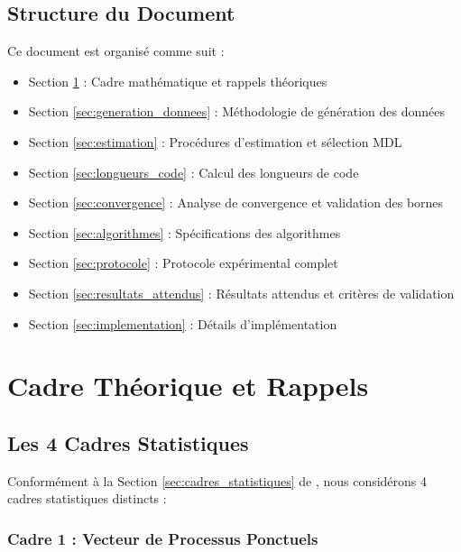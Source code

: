 \documentclass[12pt,a4paper]{article}
\begin{document}
	\subsection{Structure du Document}
	\label{subsec:structure}
	
	Ce document est organisé comme suit :
	\begin{itemize}
		\item Section \ref{sec:cadre_theorique} : Cadre mathématique et rappels théoriques
		\item Section \ref{sec:generation_donnees} : Méthodologie de génération des données
		\item Section \ref{sec:estimation} : Procédures d'estimation et sélection MDL
		\item Section \ref{sec:longueurs_code} : Calcul des longueurs de code
		\item Section \ref{sec:convergence} : Analyse de convergence et validation des bornes
		\item Section \ref{sec:algorithmes} : Spécifications des algorithmes
		\item Section \ref{sec:protocole} : Protocole expérimental complet
		\item Section \ref{sec:resultats_attendus} : Résultats attendus et critères de validation
		\item Section \ref{sec:implementation} : Détails d'implémentation
	\end{itemize}
	
	\section{Cadre Théorique et Rappels}
	\label{sec:cadre_theorique}
	
	\subsection{Les 4 Cadres Statistiques}
	\label{subsec:cadres_statistiques}
	
	Conformément à la Section \ref{sec:cadres_statistiques} de \cite{Uniform_temporal_light.tex}, nous considérons 4 cadres statistiques distincts :
	
	\subsubsection{Cadre 1 : Vecteur de Processus Ponctuels}
	\label{subsubsec:cadre_vecteur}
	
\end{document}
